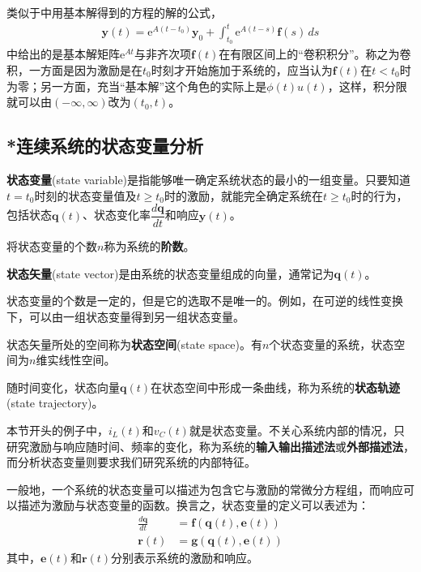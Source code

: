 类似于中用基本解得到的方程的解的公式，\begin{align*}
    \mathbf{y}(t)=\mathrm{e}^{A(t-t_0)}\mathbf{y}_0+\int_{t_0}^t \mathrm{e}^{A(t-s)}\mathbf{f}(s)\,ds
\end{align*}
中给出的是基本解矩阵$\mathrm{e}^{At}$与非齐次项$\mathbf{f}(t)$在有限区间上的“卷积积分”。称之为卷积，一方面是因为激励是在$t_0$时刻才开始施加于系统的，应当认为$\mathbf{f}(t)$在$t<t_0$时为零；另一方面，充当“基本解”这个角色的实际上是$\phi(t)u(t)$，这样，积分限就可以由$(-\infty,\infty)$改为$(t_0,t)$。

\subsection{*连续系统的状态变量分析}\label{sub:state_variable_analysis}

\begin{definition}[状态变量]
    \textbf{状态变量}(state variable)是指能够唯一确定系统状态的最小的一组变量。只要知道$t=t_0$时刻的状态变量值及$t\geq t_0$时的激励，就能完全确定系统在$t\geq t_0$时的行为，包括状态$\mathbf{q}(t)$、状态变化率$\dfrac{d\mathbf{q}}{dt}$和响应$\mathbf{y}(t)$。

    将状态变量的个数$n$称为系统的\textbf{阶数}。
\end{definition}

\begin{definition}[状态矢量]
    \textbf{状态矢量}(state vector)是由系统的状态变量组成的向量，通常记为$\mathbf{q}(t)$。
\end{definition}

状态变量的个数是一定的，但是它的选取不是唯一的。例如，在可逆的线性变换下，可以由一组状态变量得到另一组状态变量。
    
\begin{definition}[状态空间和状态轨迹]
    状态矢量所处的空间称为\textbf{状态空间}(state space)。有$n$个状态变量的系统，状态空间为$n$维实线性空间。
    
    随时间变化，状态向量$\mathbf{q}(t)$在状态空间中形成一条曲线，称为系统的\textbf{状态轨迹}(state trajectory)。
\end{definition}

本节开头的例子中，$i_L(t)$和$v_C(t)$就是状态变量。不关心系统内部的情况，只研究激励与响应随时间、频率的变化，称为系统的\textbf{输入输出描述法}或\textbf{外部描述法}，而分析状态变量则要求我们研究系统的内部特征。

一般地，一个系统的状态变量可以描述为包含它与激励的常微分方程组，而响应可以描述为激励与状态变量的函数。换言之，状态变量的定义可以表述为：\begin{align*}
    \frac{d\mathbf{q}}{dt}&=\mathbf{f}(\mathbf{q}(t),\mathbf{e}(t))\\
    \mathbf{r}(t)&=\mathbf{g}(\mathbf{q}(t),\mathbf{e}(t))
\end{align*}
其中，$\mathbf{e}(t)$和$\mathbf{r}(t)$分别表示系统的激励和响应。

